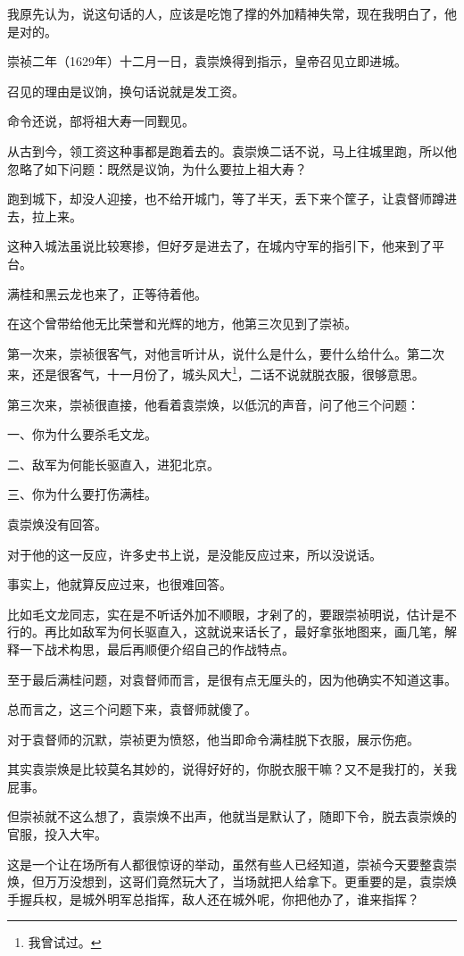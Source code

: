 \begin{multicols}{\theparacolNo}
我原先认为，说这句话的人，应该是吃饱了撑的外加精神失常，现在我明白了，他是对的。

崇祯二年（1629年）十二月一日，袁崇焕得到指示，皇帝召见立即进城。

召见的理由是议饷，换句话说就是发工资。

命令还说，部将祖大寿一同觐见。

从古到今，领工资这种事都是跑着去的。袁崇焕二话不说，马上往城里跑，所以他忽略了如下问题：既然是议饷，为什么要拉上祖大寿？

跑到城下，却没人迎接，也不给开城门，等了半天，丢下来个筐子，让袁督师蹲进去，拉上来。

这种入城法虽说比较寒掺，但好歹是进去了，在城内守军的指引下，他来到了平台。

满桂和黑云龙也来了，正等待着他。

在这个曾带给他无比荣誉和光辉的地方，他第三次见到了崇祯。

第一次来，崇祯很客气，对他言听计从，说什么是什么，要什么给什么。第二次来，还是很客气，十一月份了，城头风大\footnote{我曾试过。}，二话不说就脱衣服，很够意思。

第三次来，崇祯很直接，他看着袁崇焕，以低沉的声音，问了他三个问题：

一、你为什么要杀毛文龙。

二、敌军为何能长驱直入，进犯北京。

三、你为什么要打伤满桂。

袁崇焕没有回答。

对于他的这一反应，许多史书上说，是没能反应过来，所以没说话。

事实上，他就算反应过来，也很难回答。

比如毛文龙同志，实在是不听话外加不顺眼，才剁了的，要跟崇祯明说，估计是不行的。再比如敌军为何长驱直入，这就说来话长了，最好拿张地图来，画几笔，解释一下战术构思，最后再顺便介绍自己的作战特点。

至于最后满桂问题，对袁督师而言，是很有点无厘头的，因为他确实不知道这事。

总而言之，这三个问题下来，袁督师就傻了。

对于袁督师的沉默，崇祯更为愤怒，他当即命令满桂脱下衣服，展示伤疤。

其实袁崇焕是比较莫名其妙的，说得好好的，你脱衣服干嘛？又不是我打的，关我屁事。

但崇祯就不这么想了，袁崇焕不出声，他就当是默认了，随即下令，脱去袁崇焕的官服，投入大牢。

这是一个让在场所有人都很惊讶的举动，虽然有些人已经知道，崇祯今天要整袁崇焕，但万万没想到，这哥们竟然玩大了，当场就把人给拿下。更重要的是，袁崇焕手握兵权，是城外明军总指挥，敌人还在城外呢，你把他办了，谁来指挥？


\end{multicols}
